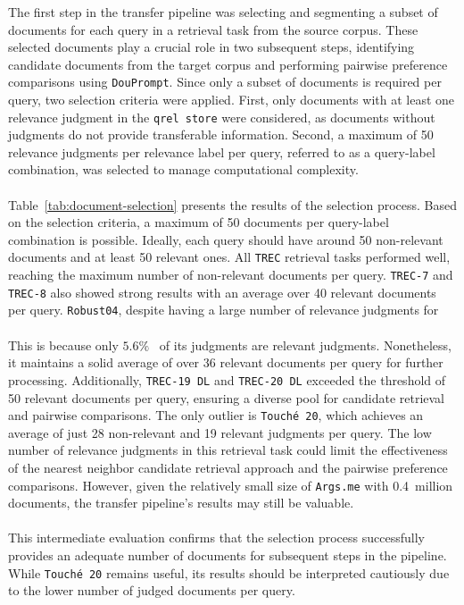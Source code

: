 The first step in the transfer pipeline was selecting and segmenting a subset of documents for each query in a retrieval task from the source corpus. These selected documents play a crucial role in two subsequent steps, identifying candidate documents from the target corpus and performing pairwise preference comparisons using \texttt{DouPrompt}. Since only a subset of documents is required per query, two selection criteria were applied. First, only documents with at least one relevance judgment in the \texttt{qrel store} were considered, as documents without judgments do not provide transferable information. Second, a maximum of 50 relevance judgments per relevance label per query, referred to as a query-label combination, was selected to manage computational complexity.
\\\\
Table~\ref{tab:document-selection} presents the results of the selection process. Based on the selection criteria, a maximum of 50 documents per query-label combination is possible. Ideally, each query should have around 50 non-relevant documents and at least 50 relevant ones. All \texttt{TREC} retrieval tasks performed well, reaching the maximum number of non-relevant documents per query. \texttt{TREC-7} and \texttt{TREC-8} also showed strong results with an average over 40 relevant documents per query. \texttt{Robust04}, despite having a large number of relevance judgments for 
\\\\
This is because only $5.6\%$~\citep{voorhees:1996} of its judgments are relevant judgments. Nonetheless, it maintains a solid average of over 36 relevant documents per query for further processing. Additionally, \texttt{TREC-19 DL} and \texttt{TREC-20 DL} exceeded the threshold of 50 relevant documents per query, ensuring a diverse pool for candidate retrieval and pairwise comparisons. The only outlier is \texttt{Touché 20}, which achieves an average of just 28 non-relevant and 19 relevant judgments per query. The low number of relevance judgments in this retrieval task could limit the effectiveness of the nearest neighbor candidate retrieval approach and the pairwise preference comparisons. However, given the relatively small size of \texttt{Args.me} with 0.4~million documents, the transfer pipeline's results may still be valuable.
\\\\
This intermediate evaluation confirms that the selection process successfully provides an adequate number of documents for subsequent steps in the pipeline. While \texttt{Touché 20} remains useful, its results should be interpreted cautiously due to the lower number of judged documents per query.

